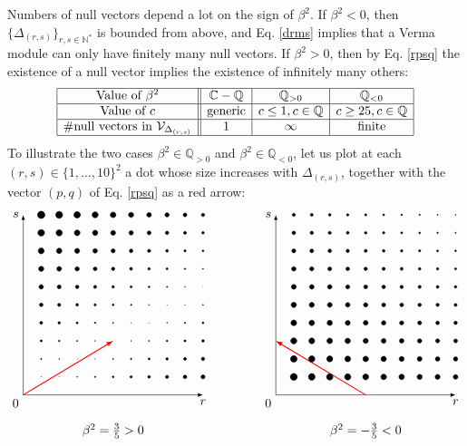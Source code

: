 \documentclass[12pt, a4paper]{article}
\theoremstyle{break}
\begin{document}
 Numbers of null vectors depend a lot on the sign of $\beta^2$. If $\beta^2<0$, then $\{\Delta_{(r, s)}\}_{r,s\in\mathbb{N}^*}$ is bounded from above, and Eq. \eqref{drms} implies that a Verma module can only have finitely many null vectors. If $\beta^2>0$, then by Eq. \eqref{rpsq} the existence of a null vector implies the existence of infinitely many others: 
\begin{align}
 \begin{array}{|c||c|c|c|}
  \hline 
  \text{Value of }\beta^2 & \mathbb{C}-\mathbb{Q} & \mathbb{Q}_{>0} & \mathbb{Q}_{<0}
  \\
  \hline 
  \text{Value of }c & \text{generic} & c\leq 1 , c\in\mathbb{Q} &  c\geq 25, c\in\mathbb{Q}
  \\
  \hline 
  \#\text{null vectors in } \mathcal{V}_{\Delta_{(r, s)}} & 1 & \infty & \text{finite} 
  \\
  \hline 
 \end{array}
\end{align}
To illustrate the two cases $\beta^2\in \mathbb{Q}_{>0}$ and $\beta^2\in \mathbb{Q}_{<0}$, let us plot at each $(r,s)\in \{1,\dots, 10\}^2$ a dot whose size increases with 
$\Delta_{(r,s)}$, together with the vector $(p, q)$ of Eq. \eqref{rpsq} as a red arrow:
\begin{align}
 \begin{tikzpicture}[baseline=(base), scale = .5]
 \coordinate (base) at (0, 4);
  \draw[latex-latex] (0, 10) node [left] {$s$} -- (0, 0) node[below left] {$0$} -- (10, 0) node [below] {$r$};
  \draw[thick, red, -latex] (0, 0) -- (5, 3);
  \foreach \r in {1,...,10}{
  \foreach \s in {1,...,10}{
  \pgfmathsetmacro{\myrad}{.2+.12*abs(3*\r-5*\s)}
  \filldraw (\r, \s) circle [radius = \myrad pt];
  }}
  \node at (5, -2) {$\beta^2 = \frac35>0$};
 \end{tikzpicture}
 \qquad \qquad
 \begin{tikzpicture}[baseline=(base), scale = .5]
 \coordinate (base) at (0, 4);
  \draw[latex-latex] (0, 10) node [left] {$s$} -- (0, 0) node[below left] {$0$} -- (10, 0) node [below] {$r$};
  \draw[thick, red, -latex] (5, 0) -- (0, 3);
  \foreach \r in {1,...,10}{
  \foreach \s in {1,...,10}{
  \pgfmathsetmacro{\myrad}{6-(3*\r+5*\s)/15}
  \filldraw (\r, \s) circle [radius = \myrad pt];
  }}
  \node at (5, -2) {$\beta^2 = -\frac35<0$};
 \end{tikzpicture}
\end{align}
\end{document}
